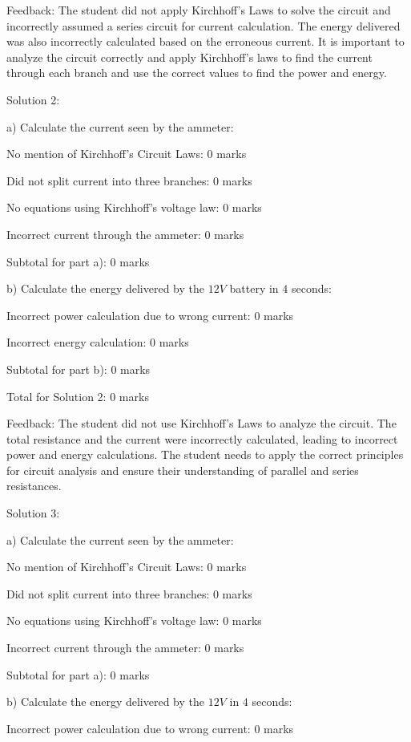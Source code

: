 \documentclass[a4paper,11pt]{article}
\begin{document}
Feedback: The student did not apply Kirchhoff's Laws to solve the circuit and incorrectly assumed a series circuit for current calculation. The energy delivered was also incorrectly calculated based on the erroneous current. It is important to analyze the circuit correctly and apply Kirchhoff's laws to find the current through each branch and use the correct values to find the power and energy.

Solution 2:

a) Calculate the current seen by the ammeter:

No mention of Kirchhoff’s Circuit Laws: 0 marks

Did not split current into three branches: 0 marks

No equations using Kirchhoff’s voltage law: 0 marks

Incorrect current through the ammeter: 0 marks

Subtotal for part a): 0 marks

b) Calculate the energy delivered by the 
\(12 V\) battery in \(4\) seconds:

Incorrect power calculation due to wrong current: 0 marks

Incorrect energy calculation: 0 marks

Subtotal for part b): 0 marks

Total for Solution 2: 0 marks

Feedback: The student did not use Kirchhoff's Laws to analyze the circuit. The total resistance and the current were incorrectly calculated, leading to incorrect power and energy calculations. The student needs to apply the correct principles for circuit analysis and ensure their understanding of parallel and series resistances.

Solution 3:

a) Calculate the current seen by the ammeter:

No mention of Kirchhoff’s Circuit Laws: 0 marks

Did not split current into three branches: 0 marks

No equations using Kirchhoff’s voltage law: 0 marks

Incorrect current through the ammeter: 0 marks

Subtotal for part a): 0 marks

b) Calculate the energy delivered by the 
\(12 V\) in \(4\) seconds:

Incorrect power calculation due to wrong current: 0 marks
\end{document}
